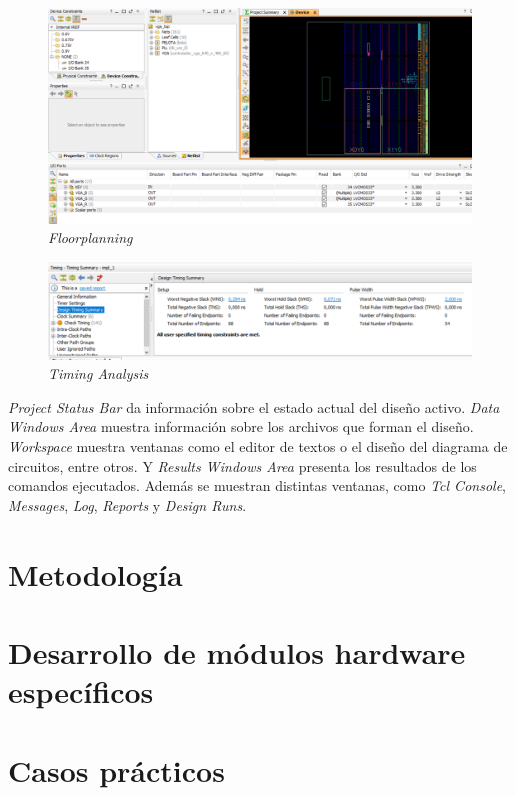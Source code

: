 \begin{figure}[H]
    \centering
    \includegraphics[width = 1\textwidth]{imagenes/fp.png}
    \caption{\textit{Floorplanning}}\label{fp}
\end{figure}

\begin{figure}[H]
    \centering
    \includegraphics[width = 1\textwidth]{imagenes/ta.png}
    \caption{\textit{Timing Analysis}}\label{ta}
\end{figure}

\textit{Project Status Bar} da información sobre el estado actual del diseño activo. \textit{Data Windows Area} muestra información 
sobre los archivos que forman el diseño. \textit{Workspace} muestra ventanas como el editor de textos o el diseño del diagrama de 
circuitos, entre otros. Y \textit{Results Windows Area} presenta los resultados de los comandos ejecutados. Además se muestran 
distintas ventanas, como \textit{Tcl Console}, \textit{Messages}, \textit{Log}, \textit{Reports} y \textit{Design Runs}.

\section{Metodología}

\section{Desarrollo de módulos hardware específicos}

\section{Casos prácticos}
